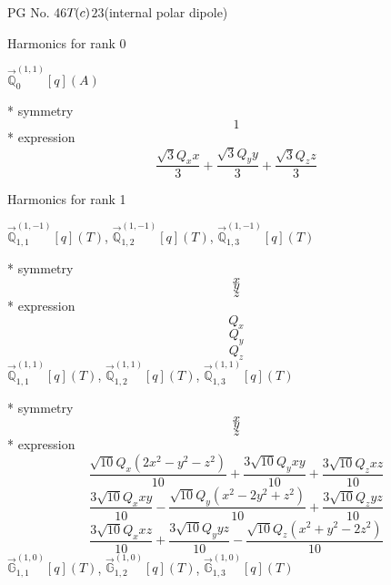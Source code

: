 \documentclass[fleqn,8pt]{jsarticle}
\begin{document}
\setcounter{MaxMatrixCols}{32}

\renewcommand{\tablename}{Table~}
\renewcommand{\figurename}{Figure~}
\begin{center}
\LARGE
PG No. 46\quad$T_{\rm }(c)$\quad$23$\quad[ cubic ] (internal polar dipole)
\end{center}

\noindent * Harmonics for rank 0

\noindent\quad $\vec{\mathbb{Q}}_{0}^{(1,1)}[q](A)$

\noindent\quad ** symmetry
\begin{dmath*}
1
\end{dmath*}
\noindent\quad ** expression
\begin{dmath*}
\frac{\sqrt{3} Q_{x} x}{3} + \frac{\sqrt{3} Q_{y} y}{3} + \frac{\sqrt{3} Q_{z} z}{3}
\end{dmath*}

\noindent * Harmonics for rank 1

\noindent\quad $\vec{\mathbb{Q}}_{1,1}^{(1,-1)}[q](T)$, $\vec{\mathbb{Q}}_{1,2}^{(1,-1)}[q](T)$, $\vec{\mathbb{Q}}_{1,3}^{(1,-1)}[q](T)$

\noindent\quad ** symmetry
\begin{dmath*}
x
\end{dmath*}
\begin{dmath*}
y
\end{dmath*}
\begin{dmath*}
z
\end{dmath*}
\noindent\quad ** expression
\begin{dmath*}
Q_{x}
\end{dmath*}
\begin{dmath*}
Q_{y}
\end{dmath*}
\begin{dmath*}
Q_{z}
\end{dmath*}
\noindent\quad $\vec{\mathbb{Q}}_{1,1}^{(1,1)}[q](T)$, $\vec{\mathbb{Q}}_{1,2}^{(1,1)}[q](T)$, $\vec{\mathbb{Q}}_{1,3}^{(1,1)}[q](T)$

\noindent\quad ** symmetry
\begin{dmath*}
x
\end{dmath*}
\begin{dmath*}
y
\end{dmath*}
\begin{dmath*}
z
\end{dmath*}
\noindent\quad ** expression
\begin{dmath*}
\frac{\sqrt{10} Q_{x} \left(2 x^{2} - y^{2} - z^{2}\right)}{10} + \frac{3 \sqrt{10} Q_{y} x y}{10} + \frac{3 \sqrt{10} Q_{z} x z}{10}
\end{dmath*}
\begin{dmath*}
\frac{3 \sqrt{10} Q_{x} x y}{10} - \frac{\sqrt{10} Q_{y} \left(x^{2} - 2 y^{2} + z^{2}\right)}{10} + \frac{3 \sqrt{10} Q_{z} y z}{10}
\end{dmath*}
\begin{dmath*}
\frac{3 \sqrt{10} Q_{x} x z}{10} + \frac{3 \sqrt{10} Q_{y} y z}{10} - \frac{\sqrt{10} Q_{z} \left(x^{2} + y^{2} - 2 z^{2}\right)}{10}
\end{dmath*}
\noindent\quad $\vec{\mathbb{G}}_{1,1}^{(1,0)}[q](T)$, $\vec{\mathbb{G}}_{1,2}^{(1,0)}[q](T)$, $\vec{\mathbb{G}}_{1,3}^{(1,0)}[q](T)$
\end{document}
